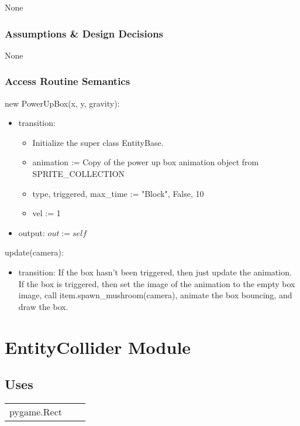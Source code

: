 \documentclass[12pt]{article}
\begin{document}
None

\subsubsection* {Assumptions \& Design Decisions}

None

\subsubsection* {Access Routine Semantics}

new PowerUpBox(x, y, gravity):
\begin{itemize}
    \item transition: 
    \begin{itemize}[]
        \item Initialize the super class EntityBase.
        \item animation := Copy of the power up box animation object from SPRITE\_COLLECTION
        \item type, triggered, max\_time := "Block", False, 10
        \item vel := 1
    \end{itemize}
    \item output: $out := self$
\end{itemize}


\noindent update(camera):
\begin{itemize}
    \item transition: If the box hasn't been triggered, then just update the animation. If the box is triggered, then set the image of the animation to the empty box image, call item.spawn\_mushroom(camera), animate the box bouncing, and draw the box. 
\end{itemize}

\newpage

\section*{EntityCollider Module}

\subsection* {Uses}

\begin{tabular}{lll}
    pygame.Rect & & \\
\end{tabular}
\end{document}
